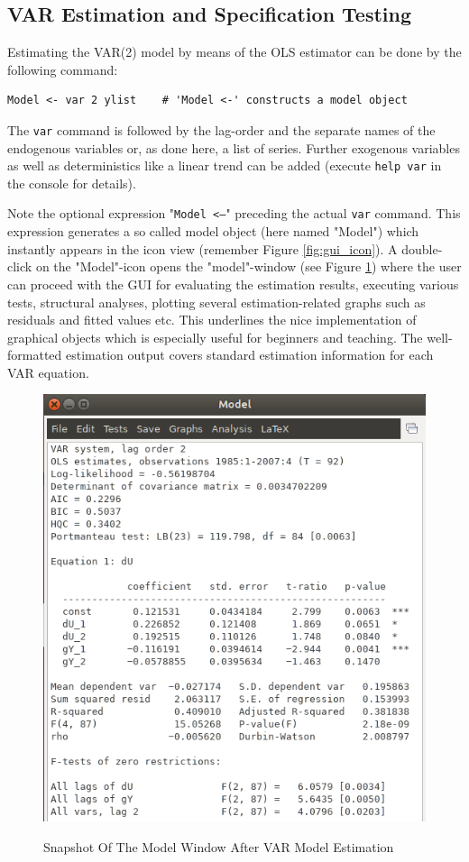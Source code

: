 \documentclass[11pt]{article}
\begin{document}
\subsection{VAR Estimation and Specification Testing}
Estimating the VAR(2) model by means of the OLS estimator can be done by the following command:
\begin{Verbatim}[baselinestretch=0.75, fontsize=\small]
Model <- var 2 ylist	# 'Model <-' constructs a model object
\end{Verbatim}
The \texttt{var} command is followed by the lag-order and the separate names of the endogenous variables or, as done here, a list of series. Further exogenous variables as well as deterministics like a linear trend can be added (execute \texttt{help var} in the console for details).

Note the optional expression "\texttt{Model <--}" preceding the actual \texttt{var} command. This expression generates a so called model object (here named "Model") which instantly appears in the icon view (remember Figure \ref{fig:gui_icon}). A double-click on the "Model"-icon opens the "model"-window (see Figure \ref{fig:gui_model}) where the user can proceed with the GUI for evaluating the estimation results, executing various tests, structural analyses, plotting several estimation-related graphs such as residuals and fitted values etc. This underlines the nice implementation of graphical objects which is especially useful for beginners and teaching.
The well-formatted estimation output covers standard estimation information for each VAR equation.

\begin{figure}[!h]
	\centering
	\caption{Snapshot Of The Model Window After VAR Model Estimation}
	\includegraphics[width=.42\textwidth]{../figures/gui_var}	
	\label{fig:gui_model}
\end{figure}
\end{document}

